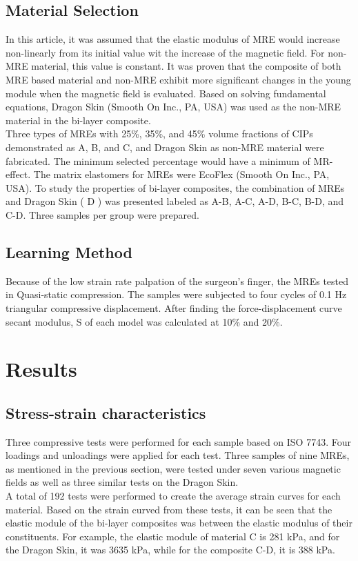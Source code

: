 \documentclass[conference]{IEEEtran}
\begin{document}
\subsection{Material Selection}
In this article, it was assumed that the elastic modulus of MRE would increase non-linearly from its initial value wit the increase of the magnetic field. For non-MRE material, this value is constant. It was proven that the composite of both MRE based material and non-MRE exhibit more significant changes in the young module when the magnetic field is evaluated. Based on solving fundamental equations, Dragon Skin (Smooth On Inc., PA, USA) was used as the non-MRE material in the bi-layer composite.\\
Three types of MREs with 25\%, 35\%, and 45\% volume fractions of CIPs demonstrated as A, B, and C, and Dragon Skin as non-MRE material were fabricated. The minimum selected percentage would have a minimum of MR-effect. The matrix elastomers for MREs were EcoFlex (Smooth On Inc., PA, USA). To study the properties of bi-layer composites, the combination of MREs and Dragon Skin ( D ) was presented labeled as A-B, A-C, A-D, B-C, B-D, and C-D. Three samples per group were prepared. 

\subsection{Learning Method}
Because of the low strain rate palpation of the surgeon's finger, the MREs tested in Quasi-static compression. The samples were subjected to four cycles of 0.1 Hz triangular compressive displacement. After finding the force-displacement curve secant modulus, S of each model was calculated at 10\% and 20\%.
\section{Results} \label{results}
\subsection{Stress-strain characteristics}
Three compressive tests were performed for each sample based on ISO 7743. Four loadings and unloadings were applied for each test. Three samples of nine MREs, as mentioned in the previous section, were tested under seven various magnetic fields as well as three similar tests on the Dragon Skin. \\
A total of 192 tests were performed to create the average strain curves for each material. Based on the strain curved from these tests, it can be seen that the elastic module of the bi-layer composites was between the elastic modulus of their constituents. For example, the elastic module of material C is 281 kPa, and for the Dragon Skin, it was 3635 kPa, while for the composite C-D, it is 388 kPa. 
\end{document}
